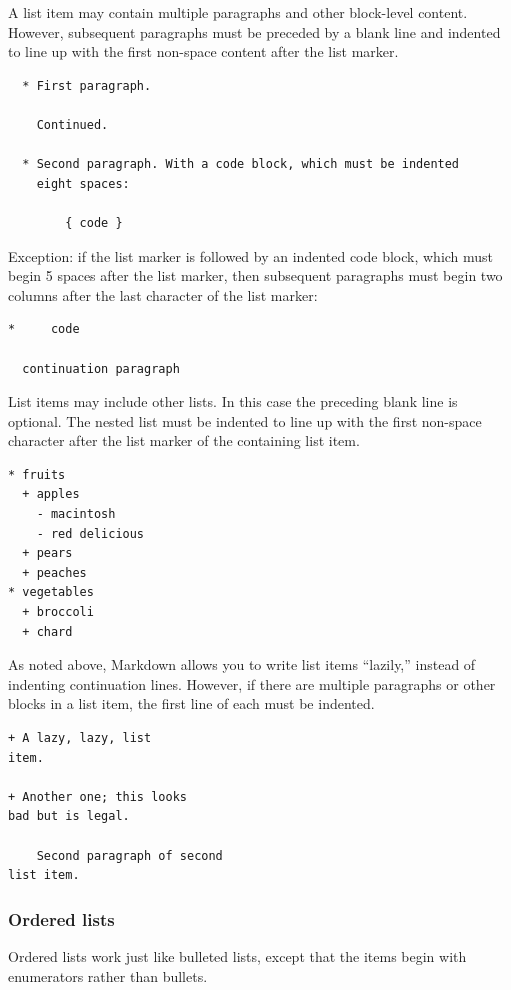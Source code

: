 \documentclass[
]{article}
\begin{document}
A list item may contain multiple paragraphs and other block-level
content. However, subsequent paragraphs must be preceded by a blank line
and indented to line up with the first non-space content after the list
marker.

\begin{verbatim}
  * First paragraph.

    Continued.

  * Second paragraph. With a code block, which must be indented
    eight spaces:

        { code }
\end{verbatim}

Exception: if the list marker is followed by an indented code block,
which must begin 5 spaces after the list marker, then subsequent
paragraphs must begin two columns after the last character of the list
marker:

\begin{verbatim}
*     code

  continuation paragraph
\end{verbatim}

List items may include other lists. In this case the preceding blank
line is optional. The nested list must be indented to line up with the
first non-space character after the list marker of the containing list
item.

\begin{verbatim}
* fruits
  + apples
    - macintosh
    - red delicious
  + pears
  + peaches
* vegetables
  + broccoli
  + chard
\end{verbatim}

As noted above, Markdown allows you to write list items ``lazily,''
instead of indenting continuation lines. However, if there are multiple
paragraphs or other blocks in a list item, the first line of each must
be indented.

\begin{verbatim}
+ A lazy, lazy, list
item.

+ Another one; this looks
bad but is legal.

    Second paragraph of second
list item.
\end{verbatim}

\hypertarget{ordered-lists}{%
\subsubsection{Ordered lists}\label{ordered-lists}}

Ordered lists work just like bulleted lists, except that the items begin
with enumerators rather than bullets.
\end{document}
